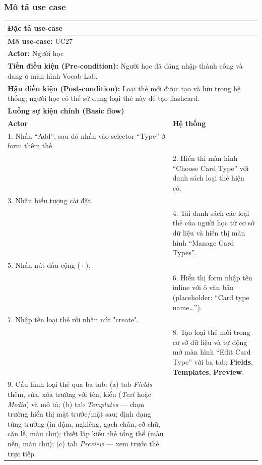 \subsubsection{Mô tả use case}
\begin{table}[H]
    \centering
    \renewcommand{\arraystretch}{1.3}
    \begin{tabularx}{\linewidth}{|X|X|}
        \hline
        \multicolumn{2}{|l|}{\textbf{Đặc tả use-case}} \\ \hline
        \multicolumn{2}{|l|}{\textbf{Mã use-case:} UC27} \\ \hline
        \multicolumn{2}{|l|}{\textbf{Actor:} Người học} \\ \hline
        \multicolumn{2}{|p{\dimexpr\linewidth-2\tabcolsep-2\arrayrulewidth}|}{\textbf{Tiền điều kiện (Pre-condition):} Người học đã đăng nhập thành công và đang ở màn hình Vocab Lab.} \\ \hline
        \multicolumn{2}{|p{\dimexpr\linewidth-2\tabcolsep-2\arrayrulewidth}|}{\textbf{Hậu điều kiện (Post-condition):} Loại thẻ mới được tạo và lưu trong hệ thống; người học có thể sử dụng loại thẻ này để tạo flashcard.} \\ \hline
        \multicolumn{2}{|l|}{\textbf{Luồng sự kiện chính (Basic flow)}} \\ \hline
        \textbf{Actor} & \textbf{Hệ thống} \\ \hline
        1. Nhấn ``Add'', sau đó nhấn vào selector ``Type'' ở form thêm thẻ. & \\ \hline
        & 2. Hiển thị màn hình ``Choose Card Type'' với danh sách loại thẻ hiện có. \\ \hline
        3. Nhấn biểu tượng cài đặt. & \\ \hline
        & 4. Tải danh sách các loại thẻ của người học từ cơ sở dữ liệu và hiển thị màn hình ``Manage Card Types''. \\ \hline
        5. Nhấn nút dấu cộng (+). & \\ \hline
        & 6. Hiển thị form nhập tên inline với ô văn bản (placeholder: ``Card type name\ldots''). \\ \hline
        7. Nhập tên loại thẻ rồi nhấn nút "create". & \\ \hline
        & 8. Tạo loại thẻ mới trong cơ sở dữ liệu và tự động mở màn hình ``Edit Card Type'' với ba tab: \textbf{Fields}, \textbf{Templates}, \textbf{Preview}. \\ \hline
        9. Cấu hình loại thẻ qua ba tab: (a) tab \textit{Fields} --- thêm, sửa, xóa trường với tên, kiểu (\textit{Text} hoặc \textit{Media}) và mô tả; (b) tab \textit{Templates} --- chọn trường hiển thị mặt trước/mặt sau; định dạng từng trường (in đậm, nghiêng, gạch chân, cỡ chữ, căn lề, màu chữ); thiết lập kiểu thẻ tổng thể (màu nền, màu chữ); (c) tab \textit{Preview} --- xem trước thẻ trực tiếp. & \\ \hline

\end{tabularx}
\end{table}
